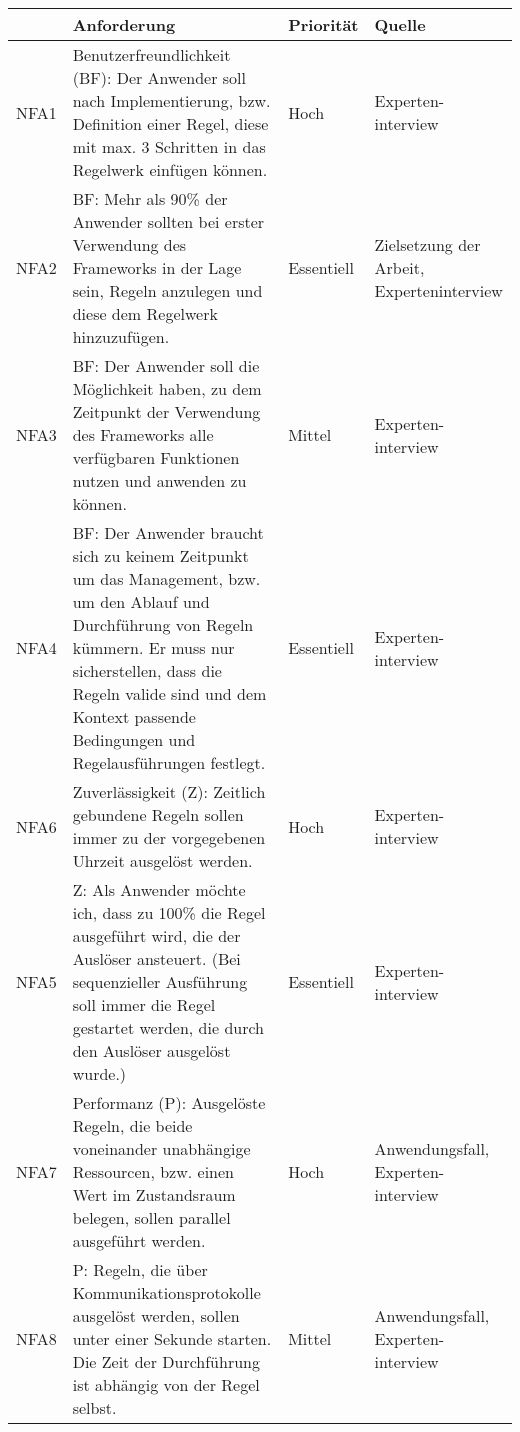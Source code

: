 \begin{table}[hbt!]
    \begin{center}
        \begin{tabular}{ | p{1.0cm} | p{9.7cm} | p{1.6cm} | p{2.6cm} | }
            \hline
                \textbf{} & \textbf{Anforderung} & \textbf{Priorität} & \textbf{Quelle} \\
            \hline
                NFA1 & Benutzerfreundlichkeit (BF): Der Anwender soll nach Implementierung, bzw. Definition einer Regel, diese mit max. 3 Schritten in das Regelwerk einfügen können. & Hoch & Experten-interview \\
            \hline
                NFA2 & BF: Mehr als 90\% der Anwender sollten bei erster Verwendung des Frameworks in der Lage sein, Regeln anzulegen und diese dem Regelwerk hinzuzufügen. & Essentiell & Zielsetzung der Arbeit, Experteninterview \\ 
            \hline
                NFA3 & BF: Der Anwender soll die Möglichkeit haben, zu dem Zeitpunkt der Verwendung des Frameworks alle verfügbaren Funktionen nutzen und anwenden zu können. & Mittel & Experten-interview \\ 
            \hline
                NFA4 & BF: Der Anwender braucht sich zu keinem Zeitpunkt um das Management, bzw. um den Ablauf und Durchführung von Regeln kümmern. Er muss nur sicherstellen, dass die Regeln valide sind und dem Kontext passende Bedingungen und Regelausführungen festlegt. & Essentiell & Experten-interview \\ 
            \hline
                NFA6 & Zuverlässigkeit (Z): Zeitlich gebundene Regeln sollen immer zu der vorgegebenen Uhrzeit ausgelöst werden. & Hoch & Experten-interview \\
            \hline
                NFA5 & Z: Als Anwender möchte ich, dass zu 100\% die Regel ausgeführt wird, die der Auslöser ansteuert. (Bei sequenzieller Ausführung soll immer die Regel gestartet werden, die durch den Auslöser ausgelöst wurde.) & Essentiell & Experten-interview \\
            \hline
                NFA7 & Performanz (P): Ausgelöste Regeln, die beide voneinander unabhängige Ressourcen, bzw. einen Wert im Zustandsraum belegen, sollen parallel ausgeführt werden. & Hoch & Anwendungsfall, Experten-interview \\ 
            \hline
                NFA8 & P: Regeln, die über Kommunikationsprotokolle ausgelöst werden, sollen unter einer Sekunde starten. Die Zeit der Durchführung ist abhängig von der Regel selbst. & Mittel & Anwendungsfall, Experten-interview \\ 

\end{tabular}
\end{center}
\end{table}

